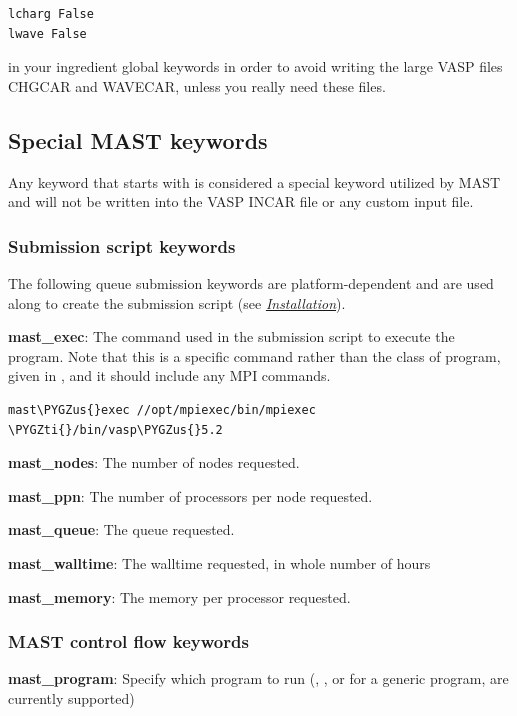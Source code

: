 \documentclass[letterpaper,10pt,english]{sphinxmanual}
\def\PYGZus{\char`\_}
\def\PYGZti{\char`\~}
\begin{document}
\begin{Verbatim}[commandchars=\\\{\}]
lcharg False
lwave False
\end{Verbatim}

in your ingredient global keywords in order to avoid writing the large VASP files CHGCAR and WAVECAR, unless you really need these files.


\subsection{Special MAST keywords}
\label{3_1_2_ingredients:special-mast-keywords}
Any keyword that starts with  is considered a special keyword utilized by MAST and will not be written into the VASP INCAR file or any custom input file.


\subsubsection{Submission script keywords}
\label{3_1_2_ingredients:submission-script-keywords}
The following queue submission keywords are platform-dependent and are used along to create the submission script (see {\hyperref[1_0_installation::doc]{\emph{Installation}}}).

\textbf{mast\_exec}: The command used in the submission script to execute the program. Note that this is a specific command rather than the class of program, given in , and it should include any MPI commands.

\begin{Verbatim}[commandchars=\\\{\}]
mast\PYGZus{}exec //opt/mpiexec/bin/mpiexec \PYGZti{}/bin/vasp\PYGZus{}5.2
\end{Verbatim}

\textbf{mast\_nodes}: The number of nodes requested.

\textbf{mast\_ppn}: The number of processors per node requested.

\textbf{mast\_queue}: The queue requested.

\textbf{mast\_walltime}: The walltime requested, in whole number of hours

\textbf{mast\_memory}: The memory per processor requested.


\subsubsection{MAST control flow keywords}
\label{3_1_2_ingredients:mast-control-flow-keywords}
\textbf{mast\_program}: Specify which program to run (, , or  for a generic program, are currently supported)
\end{document}
